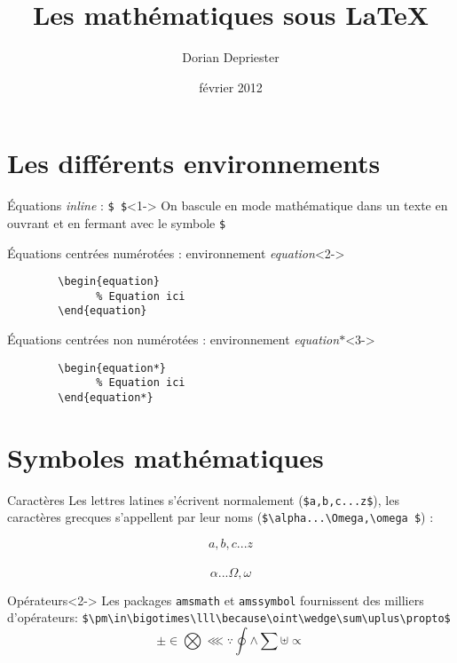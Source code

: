 \documentclass[svgnames,smaller]{beamer}
\date{février 2012}
\author{Dorian Depriester}
\title{Les mathématiques sous \LaTeX}
\begin{document}
\maketitle

\section{Les différents environnements}
\begin{frame}[fragile]
	\begin{block}{Équations \textit{inline} : \lstinline!$ $!}<1->
	  On bascule en mode mathématique dans un texte en ouvrant et en fermant avec le symbole \lstinline!$!%
	\end{block}
	\begin{block}{Équations centrées numérotées : environnement \textit{equation}}<2->
	  \begin{lstlisting}
	  	\begin{equation}
	  		  % Equation ici
	  	\end{equation}
	  \end{lstlisting}
	\end{block}
	\begin{block}{Équations centrées non numérotées : environnement \textit{equation$\ast$}}<3->
	  \begin{lstlisting}
	  	\begin{equation*}
	  		  % Equation ici
	  	\end{equation*}
	  \end{lstlisting}
	\end{block}
\end{frame}


\section{Symboles mathématiques}
\begin{frame}[fragile]
	\begin{block}{Caractères}
		Les lettres latines s'écrivent normalement (\lstinline!$a,b,c...z$!), les caractères grecques s'appellent par leur noms (\lstinline!$\alpha...\Omega,\omega $!) :
		
		$$a,b,c...z$$\\
		$$\alpha...\Omega, \omega$$
	\end{block}

\begin{block}{Opérateurs}<2->
	Les packages \texttt{amsmath} et \texttt{amssymbol} fournissent des milliers d'opérateurs: \lstinline!$\pm\in\bigotimes\lll\because\oint\wedge\sum\uplus\propto$!
	$$\pm\in\bigotimes\lll\because\oint\wedge\sum\uplus\propto$$
\end{block}
\end{frame}
\end{document}
